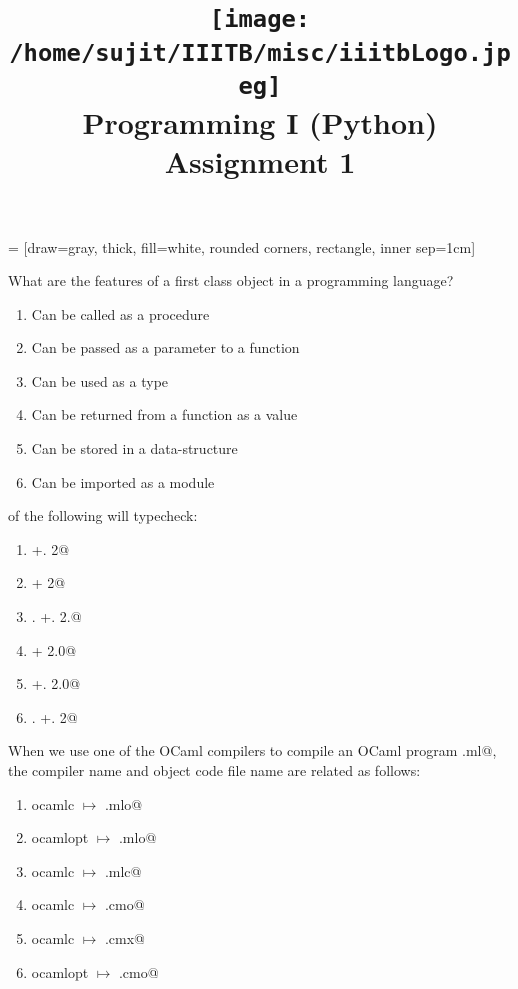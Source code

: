 \documentclass[addpoints,11pt]{exam}
\author{}
\title{\texttt{[image: /home/sujit/IIITB/misc/iiitbLogo.jpeg]} \\ Programming I (Python) \\ Assignment 1}
\date{}
\begin{document}
   = [draw=gray, thick, fill=white, rounded corners, rectangle, inner sep=1cm]
\maketitle


\thispagestyle{head}
\begin{questions}
\question What are the features of a first class object in a programming language?
\begin{enumerate}
\item Can be called as a procedure
\item Can be passed as a parameter to a function
\item Can be used as a type
\item Can be returned from a function as a value
\item Can be stored in a data-structure
\item Can be imported as a module
\end{enumerate}\question of the following will typecheck:
\begin{enumerate}
\item {} +. 2@
\item {} + 2@
\item {}. +. 2.@
\item {} + 2.0@
\item {} +. 2.0@
\item {}. +. 2@
\end{enumerate}\question When we use one of the OCaml compilers to compile an OCaml program \lstinline@program.ml@, the compiler name and object code file name are related as follows:
\begin{enumerate}
\item ocamlc $\mapsto$ \lstinline@program.mlo@
\item ocamlopt $\mapsto$ \lstinline@program.mlo@
\item ocamlc $\mapsto$ \lstinline@program.mlc@
\item ocamlc $\mapsto$ \lstinline@program.cmo@
\item ocamlc $\mapsto$ \lstinline@program.cmx@
\item ocamlopt $\mapsto$ \lstinline@program.cmo@

\end{enumerate}
\end{questions}
\end{document}

